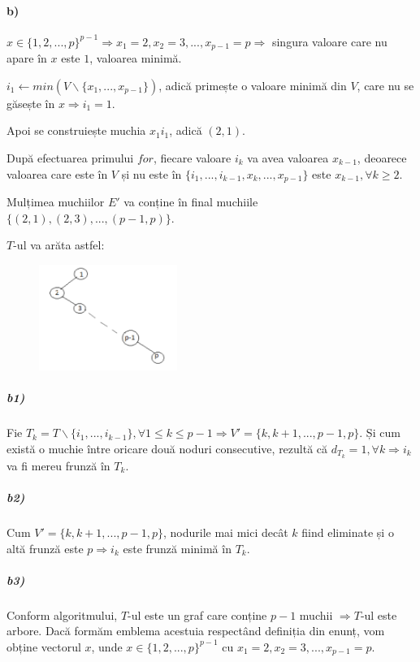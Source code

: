 \documentclass[paper=a4, fontsize=12pt]{scrartcl}
\begin{document}
\paragraph{b)}
$x \in \{1,2,...,p\}^{p-1} \Rightarrow x_1=2, x_2=3, ..., x_{p-1}=p \Rightarrow$ singura valoare care nu apare în $x$ este $1$, valoarea minimă.

$i_1 \leftarrow min (V \backslash \{x_1, ..., x_{p-1}\})$, adică primește o valoare minimă din $V$, care nu se găsește în $x \Rightarrow i_1=1$.

Apoi se construiește muchia $x_1i_1$, adică $(2,1)$.

După efectuarea primului $for$, fiecare valoare $i_k$ va avea valoarea $x_{k-1}$, deoarece valoarea care este în $V$ și nu este
în $\{i_1, ..., i_{k-1}, x_k, ..., x_{p-1}\}$ este $x_{k-1}, \forall k \geq 2$.

Mulțimea muchiilor $E'$ va conține în final muchiile $\{(2,1),(2,3), ..., (p-1,p)\}$.

$T$-ul va arăta astfel:
\begin{figure}[h!]
    \includegraphics[width=45mm]{graf.png}
\end{figure}

\subparagraph{b1)}
Fie $T_k = T \backslash \{i_1, ..., i_{k-1}\}, \forall 1 \leq k \leq p-1 \Rightarrow V'=\{k, k+1, ..., p-1, p\}$. Și cum există o muchie între oricare
două noduri consecutive, rezultă că $d_{T_k} = 1, \forall k \Rightarrow i_k$ va fi mereu frunză în $T_k$.

\subparagraph{b2)}
Cum $V'=\{k, k+1, ..., p-1, p\}$, nodurile mai mici decât $k$ fiind eliminate și o altă frunză este $p \Rightarrow i_k$ este frunză minimă în $T_k$.  

\subparagraph{b3)}
Conform algoritmului, $T$-ul este un graf care conține $p-1$ muchii $\Rightarrow T$-ul este arbore.
Dacă formăm emblema acestuia respectând definiția din enunț, vom obține vectorul $x$, unde $x \in \{1,2,...,p\}^{p-1}$ cu $x_1=2, x_2=3, ...,x_{p-1}=p$.  
\end{document}
